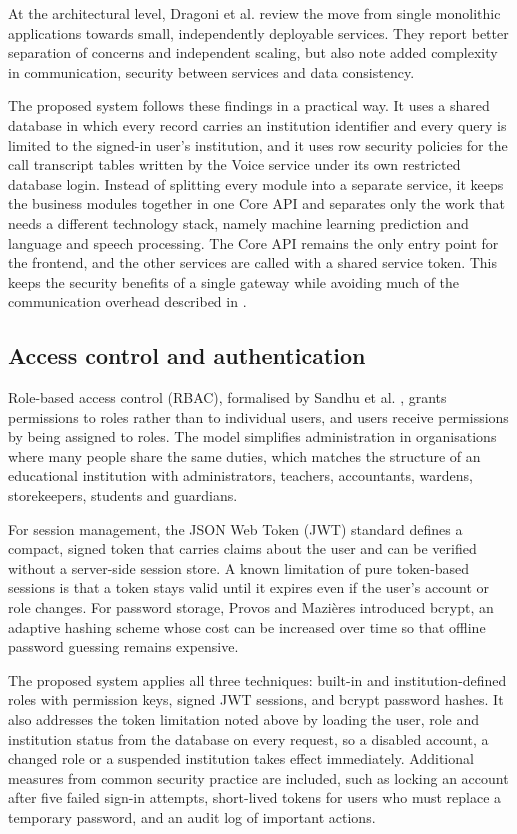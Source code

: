 At the architectural level, Dragoni et al. \cite{dragoni2017microservices} review the move from single monolithic applications towards small, independently deployable services. They report better separation of concerns and independent scaling, but also note added complexity in communication, security between services and data consistency.

The proposed system follows these findings in a practical way. It uses a shared database in which every record carries an institution identifier and every query is limited to the signed-in user's institution, and it uses row security policies for the call transcript tables written by the Voice service under its own restricted database login. Instead of splitting every module into a separate service, it keeps the business modules together in one Core API and separates only the work that needs a different technology stack, namely machine learning prediction and language and speech processing. The Core API remains the only entry point for the frontend, and the other services are called with a shared service token. This keeps the security benefits of a single gateway while avoiding much of the communication overhead described in \cite{dragoni2017microservices}.

\subsection{Access control and authentication}
Role-based access control (RBAC), formalised by Sandhu et al. \cite{sandhu1996rbac}, grants permissions to roles rather than to individual users, and users receive permissions by being assigned to roles. The model simplifies administration in organisations where many people share the same duties, which matches the structure of an educational institution with administrators, teachers, accountants, wardens, storekeepers, students and guardians.

For session management, the JSON Web Token (JWT) standard \cite{rfc7519jwt} defines a compact, signed token that carries claims about the user and can be verified without a server-side session store. A known limitation of pure token-based sessions is that a token stays valid until it expires even if the user's account or role changes. For password storage, Provos and Mazi\`{e}res \cite{provos1999bcrypt} introduced bcrypt, an adaptive hashing scheme whose cost can be increased over time so that offline password guessing remains expensive.

The proposed system applies all three techniques: built-in and institution-defined roles with permission keys, signed JWT sessions, and bcrypt password hashes. It also addresses the token limitation noted above by loading the user, role and institution status from the database on every request, so a disabled account, a changed role or a suspended institution takes effect immediately. Additional measures from common security practice are included, such as locking an account after five failed sign-in attempts, short-lived tokens for users who must replace a temporary password, and an audit log of important actions.

